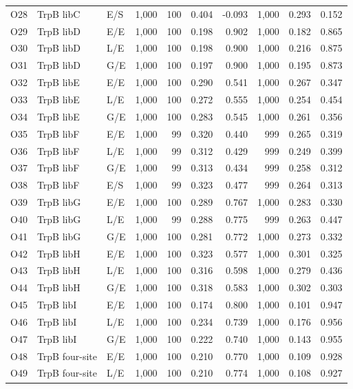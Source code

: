\begin{longtable}[c]{lllrrrrrrr}
O28 & TrpB libC & E/S & 1,000 & 100 & 0.404 & -0.093 & 1,000 & 0.293 & 0.152 \\
O29 & TrpB libD & E/E & 1,000 & 100 & 0.198 & 0.902 & 1,000 & 0.182 & 0.865 \\
O30 & TrpB libD & L/E & 1,000 & 100 & 0.198 & 0.900 & 1,000 & 0.216 & 0.875 \\
O31 & TrpB libD & G/E & 1,000 & 100 & 0.197 & 0.900 & 1,000 & 0.195 & 0.873 \\
O32 & TrpB libE & E/E & 1,000 & 100 & 0.290 & 0.541 & 1,000 & 0.267 & 0.347 \\
O33 & TrpB libE & L/E & 1,000 & 100 & 0.272 & 0.555 & 1,000 & 0.254 & 0.454 \\
O34 & TrpB libE & G/E & 1,000 & 100 & 0.283 & 0.545 & 1,000 & 0.261 & 0.356 \\
O35 & TrpB libF & E/E & 1,000 & 99 & 0.320 & 0.440 & 999 & 0.265 & 0.319 \\
O36 & TrpB libF & L/E & 1,000 & 99 & 0.312 & 0.429 & 999 & 0.249 & 0.399 \\
O37 & TrpB libF & G/E & 1,000 & 99 & 0.313 & 0.434 & 999 & 0.258 & 0.312 \\
O38 & TrpB libF & E/S & 1,000 & 99 & 0.323 & 0.477 & 999 & 0.264 & 0.313 \\
O39 & TrpB libG & E/E & 1,000 & 100 & 0.289 & 0.767 & 1,000 & 0.283 & 0.330 \\
O40 & TrpB libG & L/E & 1,000 & 99 & 0.288 & 0.775 & 999 & 0.263 & 0.447 \\
O41 & TrpB libG & G/E & 1,000 & 100 & 0.281 & 0.772 & 1,000 & 0.273 & 0.332 \\
O42 & TrpB libH & E/E & 1,000 & 100 & 0.323 & 0.577 & 1,000 & 0.301 & 0.325 \\
O43 & TrpB libH & L/E & 1,000 & 100 & 0.316 & 0.598 & 1,000 & 0.279 & 0.436 \\
O44 & TrpB libH & G/E & 1,000 & 100 & 0.318 & 0.583 & 1,000 & 0.302 & 0.303 \\
O45 & TrpB libI & E/E & 1,000 & 100 & 0.174 & 0.800 & 1,000 & 0.101 & 0.947 \\
O46 & TrpB libI & L/E & 1,000 & 100 & 0.234 & 0.739 & 1,000 & 0.176 & 0.956 \\
O47 & TrpB libI & G/E & 1,000 & 100 & 0.222 & 0.740 & 1,000 & 0.143 & 0.955 \\
O48 & TrpB four-site & E/E & 1,000 & 100 & 0.210 & 0.770 & 1,000 & 0.109 & 0.928 \\
O49 & TrpB four-site & L/E & 1,000 & 100 & 0.210 & 0.774 & 1,000 & 0.108 & 0.927 \\

\end{longtable}
